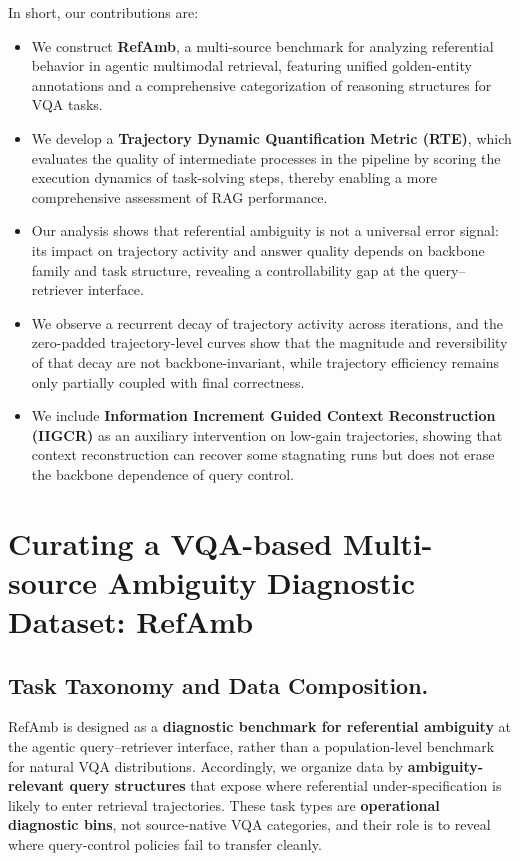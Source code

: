 \documentclass{article} %
\begin{document}
In short, our contributions are:
\begin{itemize}
    \item We construct \textbf{RefAmb}, a multi-source benchmark for analyzing referential behavior in agentic multimodal retrieval, featuring unified golden-entity annotations and a comprehensive categorization of reasoning structures for VQA tasks.
    \item We develop a \textbf{Trajectory Dynamic Quantification Metric (RTE)}, which evaluates the quality of intermediate processes in the pipeline by scoring the execution dynamics of task-solving steps, thereby enabling a more comprehensive assessment of RAG performance.
    \item Our analysis shows that referential ambiguity is not a universal error signal: its impact on trajectory activity and answer quality depends on backbone family and task structure, revealing a controllability gap at the query--retriever interface.
    \item We observe a recurrent decay of trajectory activity across iterations, and the zero-padded trajectory-level curves show that the magnitude and reversibility of that decay are not backbone-invariant, while trajectory efficiency remains only partially coupled with final correctness.
    \item We include \textbf{Information Increment Guided Context Reconstruction (IIGCR)} as an auxiliary intervention on low-gain trajectories, showing that context reconstruction can recover some stagnating runs but does not erase the backbone dependence of query control.
\end{itemize}

\section{Curating a VQA-based Multi-source Ambiguity Diagnostic Dataset: RefAmb}
\subsection{Task Taxonomy and Data Composition.}

RefAmb is designed as a \textbf{diagnostic benchmark for referential ambiguity} at the agentic query--retriever interface, rather than a population-level benchmark for natural VQA distributions.
Accordingly, we organize data by \textbf{ambiguity-relevant query structures} that expose where referential under-specification is likely to enter retrieval trajectories.
These task types are \textbf{operational diagnostic bins}, not source-native VQA categories, and their role is to reveal where query-control policies fail to transfer cleanly.
\end{document}
